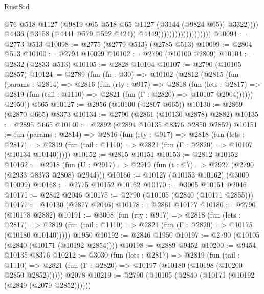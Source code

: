 \begin{lexlean}{RustStd}
\begin{coremodule}
{\begin{coremodule}
{{{{{{{{{{{{{{{{{{{{{{{{{{                                                @76
                                                @518
                                                @1127
                                                (@9819
                                                  @65
                                                  @518
                                                  @65
                                                  @1127
                                                  (@3144 (@9824 @65))
                                                  @3322))))
                                          @4436
                                          (@3158 (@4441 @579 @592 @424))
                                          @4449)))))))))))))))))))
@10094 := @2773 @513
@10098 := @2775 (@2779 @513) (@2785 @513)
@10099 := @2804 @513
@10100 := @2794 @10099
@10102 := @2790 (@10100 @2809)
@10104 := @2832 (@2833 @513)
@10105 := @2828 @10104
@10107 := @2790 (@10105 @2857)
@10124 := @2789
    (fun (fn : @30) =>
    @10102
      (@2812
        (@2815
          (fun (params : @2814) =>
          @2816
            (fun (rty : @917) =>
            @2818
              (fun (lets : @2817) =>
              @2819 (fun (tail : @1110) => @2821 (fun (Γ : @2820) => @10107 @2904))))))
        @2950))
    @665
@10127 := @2956 (@10100 (@2807 @665))
@10130 := @2869 (@2870 @665) @8373
@10134 := @2790 (@2861 (@10130 @2878) @2882)
@10135 := @2895 @665
@10140 := @2892 (@2894 @10135 @8376 @2850 @2852)
@10151 := fun (params : @2814) =>
  @2816
    (fun (rty : @917) =>
    @2818
      (fun (lets : @2817) =>
      @2819 (fun (tail : @1110) => @2821 (fun (Γ : @2820) => @10107 (@10134 @10140)))))
@10152 := @2815 @10151
@10153 := @2812 @10152
@10162 := @2918 (fun (U : @2917) => @2919 (fun (t : @7) => @2927 (@2790 (@2933 @8373 @2808) @2944)))
@10166 := @10127 (@10153 @10162) (@3000 @10099)
@10168 := @2775 @10152 @10162
@10170 := @3005 @10151 @2046
@10171 := @2842 @2046
@10175 := @2790 (@10105 (@2840 (@10171 @2855)))
@10177 := @10130 (@2877 @2046)
@10178 := @2861 @10177
@10180 := @2790 (@10178 @2882)
@10191 := @3008
    (fun (rty : @917) =>
    @2818
      (fun (lets : @2817) =>
      @2819 (fun (tail : @1110) => @2821 (fun (Γ : @2820) => @10175 (@10180 @10140)))))
    @1950
@10192 := @2846 @1950
@10197 := @2790 (@10105 (@2840 (@10171 (@10192 @2854))))
@10198 := @2889 @9452
@10200 := @9454 @10135 @8376
@10212 := @3030
    (fun (lets : @2817) =>
    @2819
      (fun (tail : @1110) =>
      @2821 (fun (Γ : @2820) => @10197 (@10180 (@10198 (@10200 @2850 @2852))))))
    @2078
@10219 := @2790 (@10105 (@2840 (@10171 (@10192 (@2849 (@2079 @2852))))))
}}}}}}}}}}}}}}}}}}}}}}}}}}
\end{coremodule}}
\end{coremodule}
\end{lexlean}
